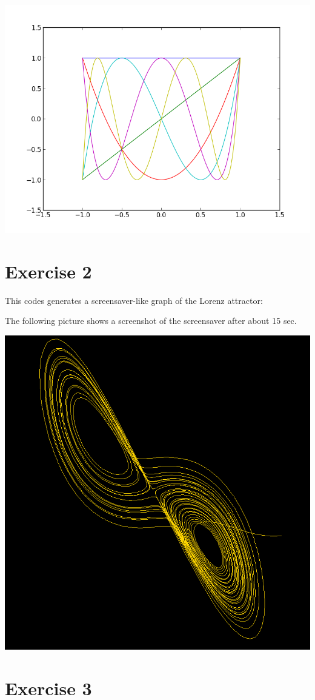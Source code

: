\documentclass[%
]
{scrartcl}
\theoremstyle{plain}
\begin{document}
\begin{center}
\centering
\includegraphics[width=0.6\linewidth]{../chebyshev_rk4.png}
\end{center}

\section*{Exercise 2}

This codes generates a screensaver-like graph of the Lorenz attractor:



The following picture shows a screenshot of the screensaver after about 15 sec.

\begin{center}
\centering
\includegraphics[width=0.6\linewidth]{../screensaver.png}
\end{center}

\section*{Exercise 3}
\end{document}
